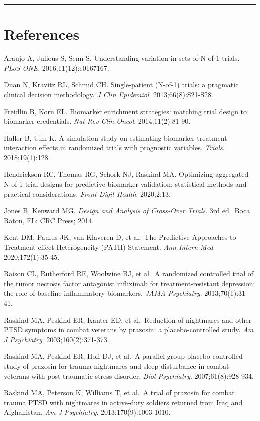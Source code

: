 \documentclass[
]{article}
\begin{document}
\bigskip\noindent

\rule{\textwidth}{0.4pt}\bigskip

\section{References}

\sloppy

Araujo A, Julious S, Senn S. Understanding variation in sets of
N-of-1 trials. \textit{PLoS ONE}. 2016;11(12):e0167167.

Duan N, Kravitz RL, Schmid CH. Single-patient (N-of-1) trials: a
pragmatic clinical decision methodology. \textit{J Clin Epidemiol}.
2013;66(8):S21-S28.

Freidlin B, Korn EL. Biomarker enrichment strategies: matching
trial design to biomarker credentials. \textit{Nat Rev Clin Oncol}.
2014;11(2):81-90.

Haller B, Ulm K. A simulation study on estimating
biomarker-treatment interaction effects in randomized trials
with prognostic variables. \textit{Trials}. 2018;19(1):128.

Hendrickson RC, Thomas RG, Schork NJ, Raskind MA. Optimizing
aggregated N-of-1 trial designs for predictive biomarker
validation: statistical methods and practical considerations.
\textit{Front Digit Health}. 2020;2:13.

Jones B, Kenward MG. \textit{Design and Analysis of Cross-Over Trials}.
3rd ed.~Boca Raton, FL: CRC Press; 2014.

Kent DM, Paulus JK, van Klaveren D, et al.~The Predictive
Approaches to Treatment effect Heterogeneity (PATH) Statement.
\textit{Ann Intern Med}. 2020;172(1):35-45.

Raison CL, Rutherford RE, Woolwine BJ, et al.~A randomized
controlled trial of the tumor necrosis factor antagonist
infliximab for treatment-resistant depression: the role of
baseline inflammatory biomarkers. \textit{JAMA Psychiatry}.
2013;70(1):31-41.

Raskind MA, Peskind ER, Kanter ED, et al.~Reduction of
nightmares and other PTSD symptoms in combat veterans by
prazosin: a placebo-controlled study. \textit{Am J Psychiatry}.
2003;160(2):371-373.

Raskind MA, Peskind ER, Hoff DJ, et al.~A parallel group
placebo-controlled study of prazosin for trauma nightmares and
sleep disturbance in combat veterans with post-traumatic stress
disorder. \textit{Biol Psychiatry}. 2007;61(8):928-934.

Raskind MA, Peterson K, Williams T, et al.~A trial of prazosin
for combat trauma PTSD with nightmares in active-duty soldiers
returned from Iraq and Afghanistan. \textit{Am J Psychiatry}.
2013;170(9):1003-1010.
\end{document}
